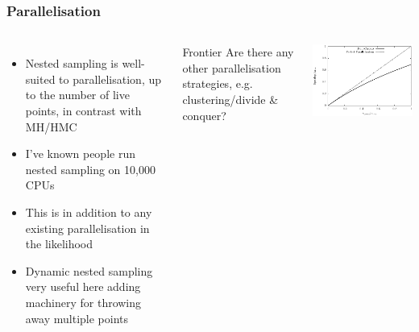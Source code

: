 \documentclass[aspectratio=169]{beamer}
\begin{document}
\begin{frame}
    \frametitle{Parallelisation}
    \begin{columns}
        \begin{itemize}
            \item Nested sampling is well-suited to parallelisation, up to the number of live points, in contrast with MH/HMC
            \item I've known people run nested sampling on 10,000 CPUs
            \item This is in addition to any existing parallelisation in the likelihood
            \item Dynamic nested sampling very useful here adding machinery for throwing away multiple points~
        \end{itemize}
        \begin{alertblock}{Frontier}
            Are there any other parallelisation strategies, e.g. clustering/divide \& conquer?
        \end{alertblock}
        \includegraphics[width=\textwidth]{figures/parallelisation}
    \end{columns}
\end{frame}
\end{document}
